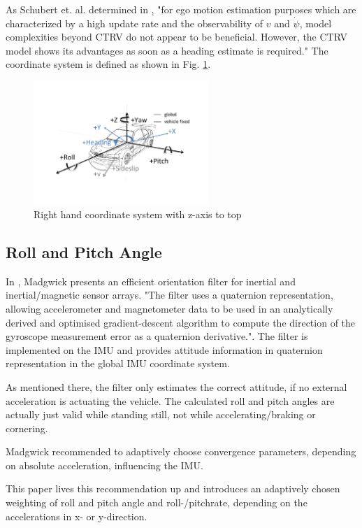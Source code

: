 \documentclass[conference]{IEEEtran}
\begin{document}
As Schubert et. al. determined in \cite{Schubert2011}, "for ego motion estimation purposes which are characterized by a high update rate and the observability of $v$ and $\dot \psi$, model complexities beyond CTRV do not appear to be beneficial. However, the CTRV model shows its advantages as soon as a heading estimate is required."
The coordinate system is defined as shown in Fig.  \ref{KOS}.

\begin{figure}[ht]
\centering
\includegraphics[width=2.6in]{images/Koordinatensystem-DIN70000.pdf}
\caption{Right hand coordinate system with z-axis to top}
\label{KOS}
\end{figure}

\subsection{Roll and Pitch Angle}

In \cite{Madgwick2010}, Madgwick presents an efficient orientation filter for inertial and inertial/magnetic sensor arrays. "The filter uses a quaternion representation, allowing accelerometer and magnetometer data to be used in an analytically derived and optimised gradient-descent algorithm to compute the direction of the gyroscope measurement error as a quaternion derivative.". The filter is implemented on the IMU and provides attitude information in quaternion representation in the global IMU coordinate system.

As mentioned there, the filter only estimates the correct attitude, if no external acceleration is actuating the vehicle. The calculated roll and pitch angles are actually just valid while standing still, not while accelerating/braking or cornering.

Madgwick recommended to adaptively choose convergence parameters, depending on absolute acceleration, influencing the IMU.

This paper lives this recommendation up and introduces an adaptively chosen weighting of roll and pitch angle and roll-/pitchrate, depending on the accelerations in x- or y-direction.
\end{document}
